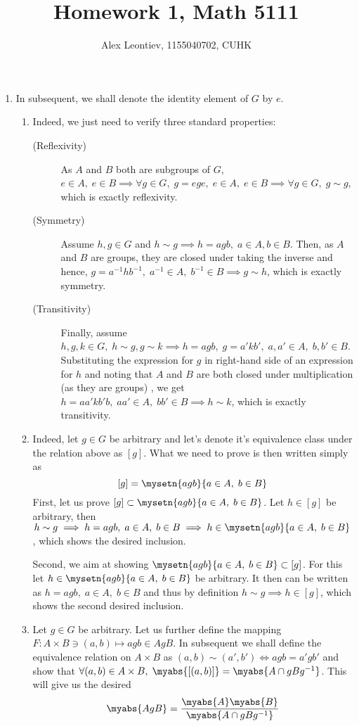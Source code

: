 \documentclass[8pt]{article} %
\title{Homework 1, Math 5111}
\author{Alex Leontiev, 1155040702, CUHK}
\begin{document}
\maketitle
\begin{enumerate}[label=\bfseries Problem \arabic*.]
	\item{In subsequent, we shall denote the identity element of $G$ by $e$.
		\begin{enumerate}[label=(\arabic*)]
			\item{Indeed, we just need to verify three standard properties:
				\begin{description}
					\item[(Reflexivity)]{As $A$ and $B$ both are subgroups of $G$, $e\in A,\;e\in B\implies
						\forall g\in G,\; g=ege,\;e\in A,\;e\in B\implies \forall g\in G,\; g\sim g$,
						which is exactly reflexivity.}
					\item[(Symmetry)]{Assume $h,g\in G$ and $h\sim g\implies h=agb,\;a\in A,b\in B$. 
						Then, as $A$ and $B$ are groups, they are
						closed under taking the inverse and hence, $g=a^{-1}hb^{-1},\;a^{-1}\in A,\;b^{-1}\in
						B\implies g\sim h$, which is exactly symmetry.}
					\item[(Transitivity)]{Finally, assume $h,g,k\in G,\; h\sim g,g\sim k\implies
						h=agb,\;g=a'kb',\;a,a'\in A,\;b,b'\in B$. Substituting
						the expression for $g$ in right-hand
						side of an expression for $h$ and noting
						that $A$ and $B$ are both closed under multiplication (as they are groups)
						, we get $h=aa'kb'b,\;aa'\in A,\;bb'\in B\implies
						h\sim k$, which is exactly transitivity.}
				\end{description}
				}
			\item{Indeed, let $g\in G$ be arbitrary and let's denote it's equivalence class under the relation above
				as $[g]$. What we need to prove is then written simply as
				\[[g]=\mysetn{agb}{a\in A,\;b\in B}\]
				First, let us prove $[g]\subset \mysetn{agb}{a\in A,\;b\in B}$. Let $h\in[g]$ be arbitrary,
				then $h\sim g\implies h=agb,\;a\in A,\;b\in B\implies h\in\mysetn{agb}{a\in A,\;b\in B}$, which
				shows the desired inclusion.

				Second, we aim at showing $\mysetn{agb}{a\in A,\;b\in B}\subset [g]$. For this let
				$h\in\mysetn{agb}{a\in A,\;b\in B}$ be arbitrary. It then can be written as $h=agb,\;a\in A,\;b\in B$
				and thus by definition $h\sim g\implies h\in [g]$, which shows the second desired inclusion.
				}
			\item{Let $g\in G$ be arbitrary. Let us further define the mapping $F:A\times B\ni(a,b)\mapsto agb\in AgB$. In subsequent we shall define the 
				equivalence relation on $A\times B$ as $(a,b)\sim (a',b')\iff agb=a'gb'$ and show that $\forall (a,b)\in A\times B,\;\myabs{[(a,b)]}=
				\myabs{A\cap gBg^{-1}}$. This will give us the desired
				\[\myabs{AgB}=\frac{\myabs{A}\myabs{B}}{\myabs{A\cap gBg^{-1}}}\]

}
\end{enumerate}}
\end{enumerate}
\end{document}
